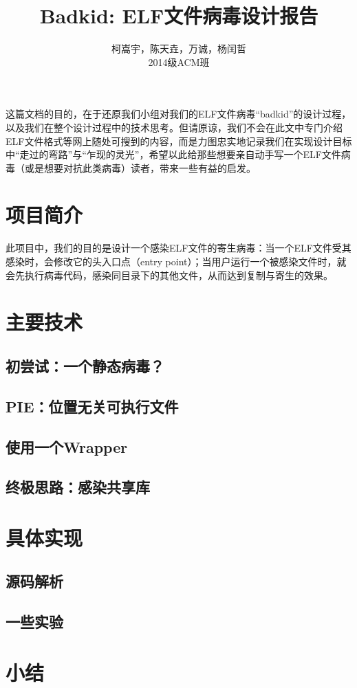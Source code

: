 \documentclass[11pt]{article}
\begin{document}
\title{Badkid: ELF文件病毒设计报告}
\author{柯嵩宇，陈天垚，万诚，杨闰哲\vspace{1em} \\ 2014级ACM班}
\maketitle

这篇文档的目的，在于还原我们小组对我们的ELF文件病毒“badkid”的设计过程，以及我们在整个设计过程中的技术思考。但请原谅，我们不会在此文中专门介绍ELF文件格式等网上随处可搜到的内容，而是力图忠实地记录我们在实现设计目标中“走过的弯路”与“乍现的灵光”，希望以此给那些想要亲自动手写一个ELF文件病毒（或是想要对抗此类病毒）读者，带来一些有益的启发。

\tableofcontents
\newpage
\section{项目简介}
	此项目中，我们的目的是设计一个感染ELF文件的寄生病毒：当一个ELF文件受其感染时，会修改它的头入口点（entry point）；当用户运行一个被感染文件时，就会先执行病毒代码，感染同目录下的其他文件，从而达到复制与寄生的效果。
	
\section{主要技术}
\subsection{初尝试：一个静态病毒？}
\subsection{PIE：位置无关可执行文件}
\subsection{使用一个Wrapper}
\subsection{终极思路：感染共享库}
\section{具体实现}
\subsection{源码解析}
\subsection{一些实验}
\section{小结}
\end{document}
